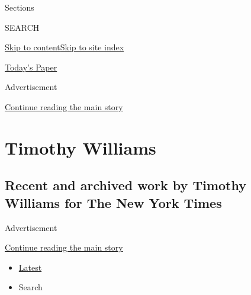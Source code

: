 Sections

SEARCH

\protect\hyperlink{site-content}{Skip to
content}\protect\hyperlink{site-index}{Skip to site index}

\href{https://myaccount.nytimes.com/auth/login?response_type=cookie\&client_id=vi}{}

\href{https://www.nytimes.com/section/todayspaper}{Today's Paper}

Advertisement

\protect\hyperlink{after-top}{Continue reading the main story}

\hypertarget{timothy-williams}{%
\section{Timothy Williams}\label{timothy-williams}}

\hypertarget{recent-and-archived-work-by-timothy-williams-for-the-new-york-times}{%
\subsection{Recent and archived work by Timothy Williams for The New
York
Times}\label{recent-and-archived-work-by-timothy-williams-for-the-new-york-times}}

Advertisement

\protect\hyperlink{after-mid1}{Continue reading the main story}

\begin{itemize}
\tightlist
\item
  \protect\hyperlink{stream-panel}{Latest}
\item
  Search
\end{itemize}

